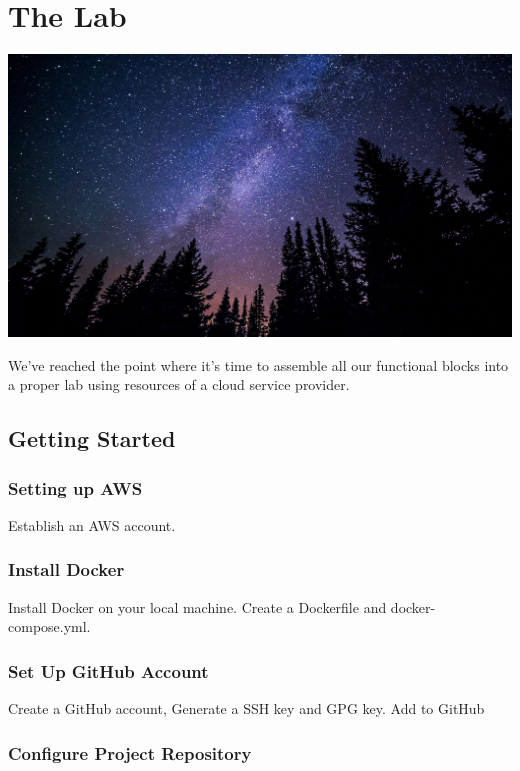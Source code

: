 \chapter{The Lab}

\includegraphics[scale=0.20]{../images/milky-way-984050_1920.jpg}

We've reached the point where it's time to assemble all our functional
blocks into a proper lab using resources of a cloud service provider.

\section{Getting Started}

\subsection{Setting up AWS}

Establish an AWS account.

\subsection{Install Docker}

Install Docker on your local machine. Create a Dockerfile and
docker-compose.yml.

\subsection{Set Up GitHub Account}

Create a GitHub account, Generate a SSH key and GPG key. Add to GitHub

\subsection{Configure Project Repository}

